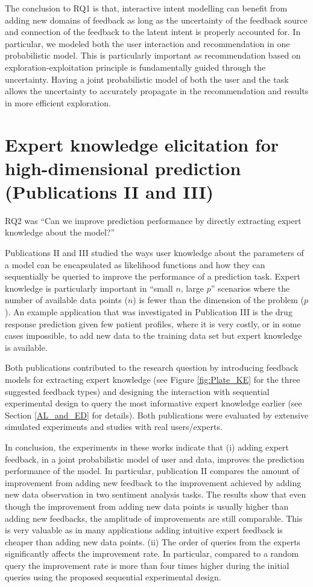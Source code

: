 \documentclass[dissertation,math,vertlayout,pdfa,colorlinks]{aaltoseries}
\begin{document}
The conclusion to RQ1 is that, interactive intent modelling can benefit from adding new domains of feedback as long as the uncertainty of the feedback source and connection of the feedback to the latent intent is properly accounted for. In particular, we modeled both the user interaction and recommendation in one probabilistic model. This is particularly important as recommendation based on exploration-exploitation principle is fundamentally guided through the uncertainty. Having a joint probabilistic model of both the user and the task allows the uncertainty to accurately propagate in the recommendation and results in more efficient exploration. 


\section{Expert knowledge elicitation for high-dimensional prediction (Publications II and III)}

RQ2 was ``Can we improve prediction performance by directly extracting expert knowledge about the model?''

Publications II and III studied the ways user knowledge about the parameters of a model can be encapsulated as likelihood functions and how they can sequentially be queried to improve the performance of a prediction task. Expert knowledge is particularly important in ``small $n$, large $p$'' scenarios where the number of available data points ($n$) is fewer than the dimension of the problem ($p$). An example application that was investigated in Publication III is the drug response prediction given few patient profiles, where it is very costly, or in some cases impossible, to add new data to the training data set but expert knowledge is available. 

Both publications contributed to the research question by introducing feedback models for extracting expert knowledge (see Figure \ref{fig:Plate_KE} for the three suggested feedback types) and designing the interaction with sequential experimental design to query the most informative expert knowledge earlier (see Section \ref{AL_and_ED} for details). Both publications were evaluated by extensive simulated experiments and studies with real users/experts.

In conclusion, the experiments in these works indicate that (i) adding expert feedback, in a joint probabilistic model of user and data, improves the prediction performance of the model. In particular, publication II compares the amount of improvement from adding new feedback to the improvement achieved by adding new data observation in two sentiment analysis tasks. The results show that even though the improvement from adding new data points is usually higher than adding new feedbacks, the amplitude of improvements are still comparable. This is very valuable as in many applications adding intuitive expert feedback is cheaper than adding new data points. (ii) The order of queries from the experts significantly affects the improvement rate. In particular, compared to a random query the improvement rate is more than four times higher during the initial queries using the proposed sequential experimental design.
\end{document}
